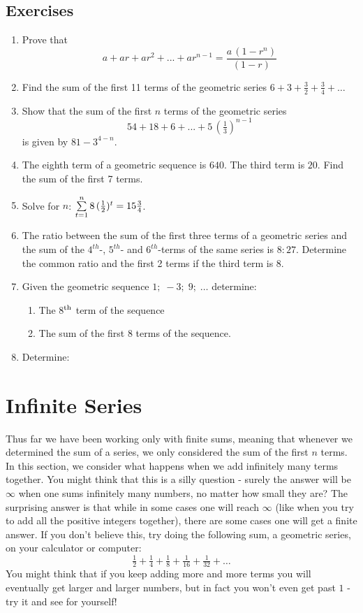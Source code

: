 \subsection{Exercises}
\begin{enumerate}
\item Prove that $$a + ar + ar^2 + ... + ar^{n-1} = \dfrac{a\,(1 - r^n)}{(1-r)}$$
\item Find the sum of the first 11 terms of the geometric series $6 + 3 + \tfrac{3}{2} + \tfrac{3}{4} + \ldots$
\item Show that the sum of the first $n$ terms of the geometric series $$54 + 18 + 6 + ... + 5 \, (\tfrac{1}{3})^{n-1}$$ is given by $81 - 3^{4-n}$.
\item The eighth term of a geometric sequence is $640$. The third term is $20$. Find the sum of the first 7 terms.
\item Solve for $n$: $\sum_{t=1}^n \limits 8 \, (\tfrac{1}{2})^t = 15\tfrac{3}{4}$.
\item The ratio between the sum of the first three terms of a geometric series and the sum of the $4^{th}$-, $5^{th}$- and $6^{th}$-terms of the same series is $8:27$. Determine the common ratio and the first 2 terms if the third term is $8$.
\item{Given the geometric sequence $1;\;-3;\; 9;\;\dots$ determine:
\begin{enumerate}
\item{The 8$^{\rm{th}}$ term of the sequence}
\item{The sum of the first 8 terms of the sequence.}
\end{enumerate}}
\item{Determine:
}
\end{enumerate}

\section{Infinite Series}
Thus far we have been working only with finite sums, meaning that whenever we determined the sum of a series, we only considered the sum of the first $n$ terms. In this section, we consider what happens when we add infinitely many terms together. You might think that this is a silly question - surely the answer will be $\infty$ when one sums infinitely many numbers, no matter how small they are? The surprising answer is that while in some cases one will reach $\infty$ (like when you try to add all the positive integers together), there are some cases one will get a finite answer. If you don't believe this, try doing the following sum, a geometric series, on your calculator or computer:
$$\tfrac{1}{2} + \tfrac{1}{4} + \tfrac{1}{8} + \tfrac{1}{16} + \tfrac{1}{32} + \ldots $$
You might think that if you keep adding more and more terms you will eventually get larger and larger numbers, but in fact you won't even get past $1$ - try it and see for yourself!

